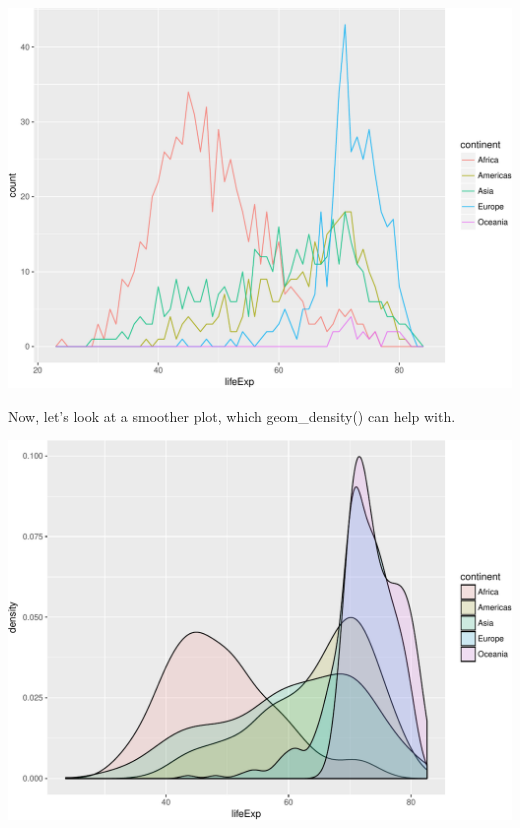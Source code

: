 \documentclass[]{article}
\newenvironment{Shaded}{\begin{snugshade}}{\end{snugshade}}
\newcommand{\KeywordTok}[1]{\textcolor[rgb]{0.13,0.29,0.53}{\textbf{{#1}}}}
\newcommand{\DataTypeTok}[1]{\textcolor[rgb]{0.13,0.29,0.53}{{#1}}}
\newcommand{\FloatTok}[1]{\textcolor[rgb]{0.00,0.00,0.81}{{#1}}}
\newcommand{\StringTok}[1]{\textcolor[rgb]{0.31,0.60,0.02}{{#1}}}
\newcommand{\NormalTok}[1]{{#1}}
\begin{document}
\includegraphics{gapminder-exploration-phase2_files/figure-latex/unnamed-chunk-25-1.pdf}

Now, let's look at a smoother plot, which geom\_density() can help with.

\begin{Shaded}
\end{Shaded}

\includegraphics{gapminder-exploration-phase2_files/figure-latex/unnamed-chunk-26-1.pdf}
\end{document}
